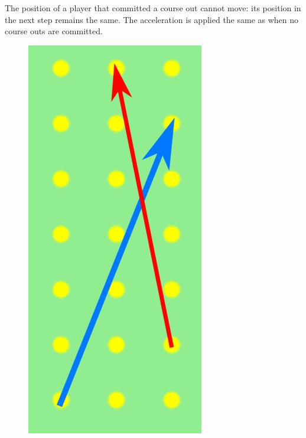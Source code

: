 \documentclass[11pt]{article}
\begin{document}
The position of a player that committed a course out cannot move: its
position in the next step remains the same.  The acceleration is
applied the same as when no course outs are committed.

\begin{figure}
  \centering
  \includegraphics[scale=0.2, natwidth=293, natheight=657]{collision.png}

\end{figure}
\end{document}
